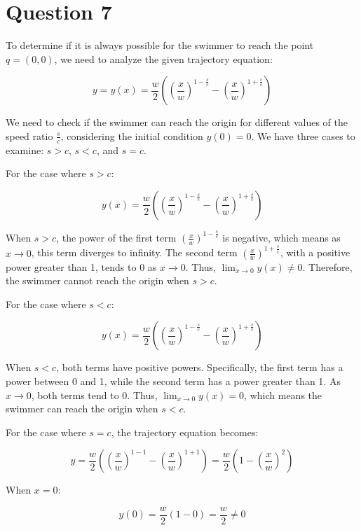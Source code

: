 \documentclass[12pt,a4paper]{article}
\begin{document}
\section*{Question 7}
\begin{solution}
To determine if it is always possible for the swimmer to reach the point \(q = (0, 0)\), we need to analyze the given trajectory equation:

\[
y = y(x) = \frac{w}{2} \left( \left( \frac{x}{w} \right)^{1 - \frac{s}{c}} - \left( \frac{x}{w} \right)^{1 + \frac{s}{c}} \right)
\]

We need to check if the swimmer can reach the origin for different values of the speed ratio \(\frac{s}{c}\), considering the initial condition \(y(0) = 0\). We have three cases to examine: \(s > c\), \(s < c\), and \(s = c\).

For the case where \(s > c\):

\[
y(x) = \frac{w}{2} \left( \left( \frac{x}{w} \right)^{1 - \frac{s}{c}} - \left( \frac{x}{w} \right)^{1 + \frac{s}{c}} \right)
\]

When \(s > c\), the power of the first term \(\left( \frac{x}{w} \right)^{1 - \frac{s}{c}}\) is negative, which means as \(x \to 0\), this term diverges to infinity. The second term \(\left( \frac{x}{w} \right)^{1 + \frac{s}{c}}\), with a positive power greater than 1, tends to 0 as \(x \to 0\). Thus, \(\lim_{x \to 0} y(x) \neq 0\). Therefore, the swimmer cannot reach the origin when \(s > c\).

For the case where \(s < c\):

\[
y(x) = \frac{w}{2} \left( \left( \frac{x}{w} \right)^{1 - \frac{s}{c}} - \left( \frac{x}{w} \right)^{1 + \frac{s}{c}} \right)
\]

When \(s < c\), both terms have positive powers. Specifically, the first term has a power between 0 and 1, while the second term has a power greater than 1. As \(x \to 0\), both terms tend to 0. Thus, \(\lim_{x \to 0} y(x) = 0\), which means the swimmer can reach the origin when \(s < c\).

For the case where \(s = c\), the trajectory equation becomes:

\[
y = \frac{w}{2} \left( \left( \frac{x}{w} \right)^{1 - 1} - \left( \frac{x}{w} \right)^{1 + 1} \right) = \frac{w}{2} \left( 1 - \left( \frac{x}{w} \right)^{2} \right)
\]

When \(x = 0\):

\[
y(0) = \frac{w}{2} \left( 1 - 0 \right) = \frac{w}{2} \neq 0
\]


\end{solution}
\end{document}
